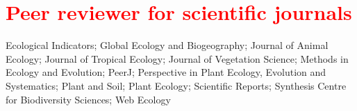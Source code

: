 \documentclass[12pt, hidelinks]{report}
\begin{document}

\section*{\textcolor{red}{Peer reviewer for scientific journals} \sout{\hfill}}

Ecological Indicators;
Global Ecology and Biogeography;
Journal of Animal Ecology;
Journal of Tropical Ecology;
Journal of Vegetation Science;
Methods in Ecology and Evolution;
PeerJ;
Perspective in Plant Ecology, Evolution and Systematics;
Plant and Soil;
Plant Ecology;
Scientific Reports;
Synthesis Centre for Biodiversity Sciences;
Web Ecology
\end{document}

